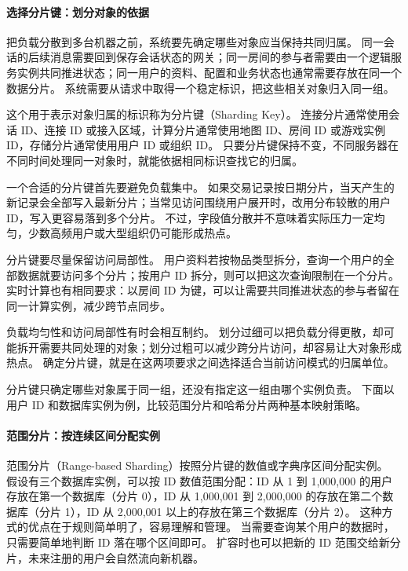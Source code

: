 \paragraph{选择分片键：划分对象的依据}

把负载分散到多台机器之前，系统要先确定哪些对象应当保持共同归属。
同一会话的后续消息需要回到保存会话状态的网关；同一房间的参与者需要由一个逻辑服务实例共同推进状态；同一用户的资料、配置和业务状态也通常需要存放在同一个数据分片。
系统需要从请求中取得一个稳定标识，把这些相关对象归入同一组。

这个用于表示对象归属的标识称为分片键（Sharding Key）。
连接分片通常使用会话 ID、连接 ID 或接入区域，计算分片通常使用地图 ID、房间 ID 或游戏实例 ID，存储分片通常使用用户 ID 或组织 ID。
只要分片键保持不变，不同服务器在不同时间处理同一对象时，就能依据相同标识查找它的归属。

一个合适的分片键首先要避免负载集中。
如果交易记录按日期分片，当天产生的新记录会全部写入最新分片；当常见访问围绕用户展开时，改用分布较散的用户 ID，写入更容易落到多个分片。
不过，字段值分散并不意味着实际压力一定均匀，少数高频用户或大型组织仍可能形成热点。

分片键要尽量保留访问局部性。
用户资料若按物品类型拆分，查询一个用户的全部数据就要访问多个分片；按用户 ID 拆分，则可以把这次查询限制在一个分片。
实时计算也有相同要求：以房间 ID 为键，可以让需要共同推进状态的参与者留在同一计算实例，减少跨节点同步。

负载均匀性和访问局部性有时会相互制约。
划分过细可以把负载分得更散，却可能拆开需要共同处理的对象；划分过粗可以减少跨分片访问，却容易让大对象形成热点。
确定分片键，就是在这两项要求之间选择适合当前访问模式的归属单位。

分片键只确定哪些对象属于同一组，还没有指定这一组由哪个实例负责。
下面以用户 ID 和数据库实例为例，比较范围分片和哈希分片两种基本映射策略。

\paragraph{范围分片：按连续区间分配实例}

范围分片（Range-based Sharding）按照分片键的数值或字典序区间分配实例。
假设有三个数据库实例，可以按 ID 数值范围分配：ID 从 1 到 1,000,000 的用户存放在第一个数据库（分片 0），ID 从 1,000,001 到 2,000,000 的存放在第二个数据库（分片 1），ID 从 2,000,001 以上的存放在第三个数据库（分片 2）。
这种方式的优点在于规则简单明了，容易理解和管理。
当需要查询某个用户的数据时，只需要简单地判断 ID 落在哪个区间即可。
扩容时也可以把新的 ID 范围交给新分片，未来注册的用户会自然流向新机器。

